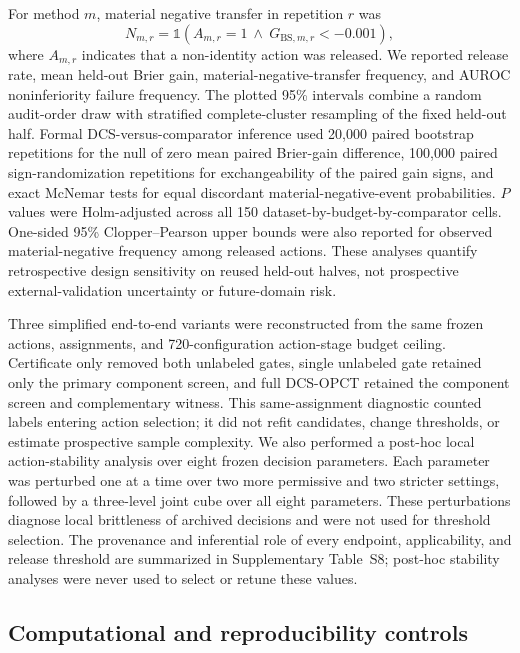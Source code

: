 \documentclass[preprint,12pt]{elsarticle}
\begin{document}
For method $m$, material negative transfer in repetition $r$ was
\begin{equation}
N_{m,r}=\mathbb{1}\!\left(A_{m,r}=1\ \land\ G_{\mathrm{BS},m,r}<-0.001\right),
\end{equation}
where $A_{m,r}$ indicates that a non-identity action was released. We reported release rate, mean held-out Brier gain, material-negative-transfer frequency, and AUROC noninferiority failure frequency. The plotted 95\% intervals combine a random audit-order draw with stratified complete-cluster resampling of the fixed held-out half. Formal DCS-versus-comparator inference used 20,000 paired bootstrap repetitions for the null of zero mean paired Brier-gain difference, 100,000 paired sign-randomization repetitions for exchangeability of the paired gain signs, and exact McNemar tests for equal discordant material-negative-event probabilities. $P$ values were Holm-adjusted across all 150 dataset-by-budget-by-comparator cells. One-sided 95\% Clopper--Pearson upper bounds were also reported for observed material-negative frequency among released actions. These analyses quantify retrospective design sensitivity on reused held-out halves, not prospective external-validation uncertainty or future-domain risk.

Three simplified end-to-end variants were reconstructed from the same frozen actions, assignments, and 720-configuration action-stage budget ceiling. Certificate only removed both unlabeled gates, single unlabeled gate retained only the primary component screen, and full DCS-OPCT retained the component screen and complementary witness. This same-assignment diagnostic counted labels entering action selection; it did not refit candidates, change thresholds, or estimate prospective sample complexity. We also performed a post-hoc local action-stability analysis over eight frozen decision parameters. Each parameter was perturbed one at a time over two more permissive and two stricter settings, followed by a three-level joint cube over all eight parameters. These perturbations diagnose local brittleness of archived decisions and were not used for threshold selection. The provenance and inferential role of every endpoint, applicability, and release threshold are summarized in Supplementary Table~S8; post-hoc stability analyses were never used to select or retune these values.

\subsection{Computational and reproducibility controls}
\end{document}
